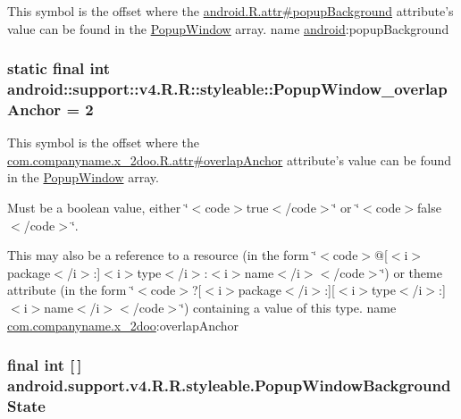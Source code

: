 This symbol is the offset where the \hyperlink{}{android.R.attr\#popupBackground} attribute's value can be found in the \hyperlink{classandroid_1_1support_1_1v4_1_1_r_1_1styleable_f2e6c1d44ab2f0d74ae025658a5ce5c3}{PopupWindow} array.  name \hyperlink{namespaceandroid}{android}:popupBackground \hypertarget{classandroid_1_1support_1_1v4_1_1_r_1_1styleable_5bdcff06e514b36248013954ab1337cb}{
\subsubsection[{PopupWindow\_\-overlapAnchor}]{\setlength{\rightskip}{0pt plus 5cm}static final int android::support::v4.R.R::styleable::PopupWindow\_\-overlapAnchor = 2}}
\label{classandroid_1_1support_1_1v4_1_1_r_1_1styleable_5bdcff06e514b36248013954ab1337cb}


This symbol is the offset where the \hyperlink{classcom_1_1companyname_1_1x__2doo_1_1_r_1_1attr_ba43bea4da1aa20643c906ef4f4c74bb}{com.companyname.x\_\-2doo.R.attr\#overlapAnchor} attribute's value can be found in the \hyperlink{classandroid_1_1support_1_1v4_1_1_r_1_1styleable_f2e6c1d44ab2f0d74ae025658a5ce5c3}{PopupWindow} array.

Must be a boolean value, either \char`\"{}$<$code$>$true$<$/code$>$\char`\"{} or \char`\"{}$<$code$>$false$<$/code$>$\char`\"{}. 

This may also be a reference to a resource (in the form \char`\"{}$<$code$>$@\mbox{[}$<$i$>$package$<$/i$>$:\mbox{]}$<$i$>$type$<$/i$>$:$<$i$>$name$<$/i$>$$<$/code$>$\char`\"{}) or theme attribute (in the form \char`\"{}$<$code$>$?\mbox{[}$<$i$>$package$<$/i$>$:\mbox{]}\mbox{[}$<$i$>$type$<$/i$>$:\mbox{]}$<$i$>$name$<$/i$>$$<$/code$>$\char`\"{}) containing a value of this type.  name \hyperlink{namespacecom_1_1companyname_1_1x__2doo}{com.companyname.x\_\-2doo}:overlapAnchor \hypertarget{classandroid_1_1support_1_1v4_1_1_r_1_1styleable_56d74cecf54da79f987d78d92156efde}{
\subsubsection[{PopupWindowBackgroundState}]{\setlength{\rightskip}{0pt plus 5cm}final int \mbox{[}$\,$\mbox{]} android.support.v4.R.R.styleable.PopupWindowBackgroundState}}
\label{classandroid_1_1support_1_1v4_1_1_r_1_1styleable_56d74cecf54da79f987d78d92156efde}


